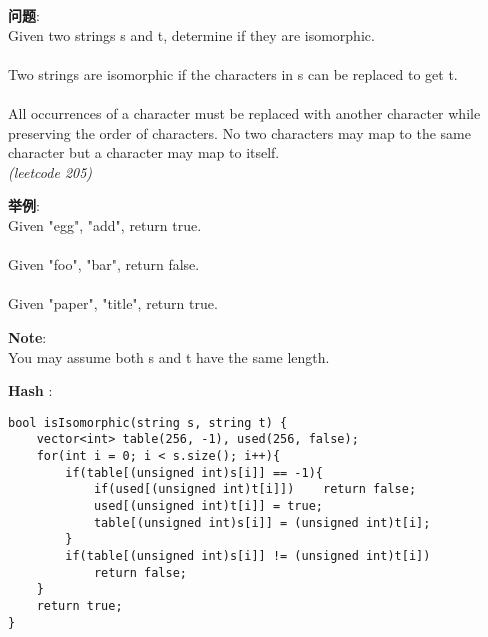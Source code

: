    
\begin{description}
    \item{\textbf{问题}}:\\
Given two strings s and t, determine if they are isomorphic.\\
\\
Two strings are isomorphic if the characters in s can be replaced to get t.\\
\\
All occurrences of a character must be replaced with another character while preserving the order of characters. No two characters may map to the same character but a character may map to itself.\\
\textit{(leetcode 205)}
    \item{\textbf{举例}}:\\
Given "egg", "add", return true.\\
\\
Given "foo", "bar", return false.\\
\\
Given "paper", "title", return true.\\
    \item{\textbf{Note}}:\\
You may assume both s and t have the same length.
    \item{\textbf{Hash}} : 
    \begin{lstlisting}
bool isIsomorphic(string s, string t) {
	vector<int> table(256, -1), used(256, false);
	for(int i = 0; i < s.size(); i++){
		if(table[(unsigned int)s[i]] == -1){
			if(used[(unsigned int)t[i]])	return false;
			used[(unsigned int)t[i]] = true;
			table[(unsigned int)s[i]] = (unsigned int)t[i];
		}
		if(table[(unsigned int)s[i]] != (unsigned int)t[i])
			return false;
	}
	return true;
}
    \end{lstlisting}
\end{description}
